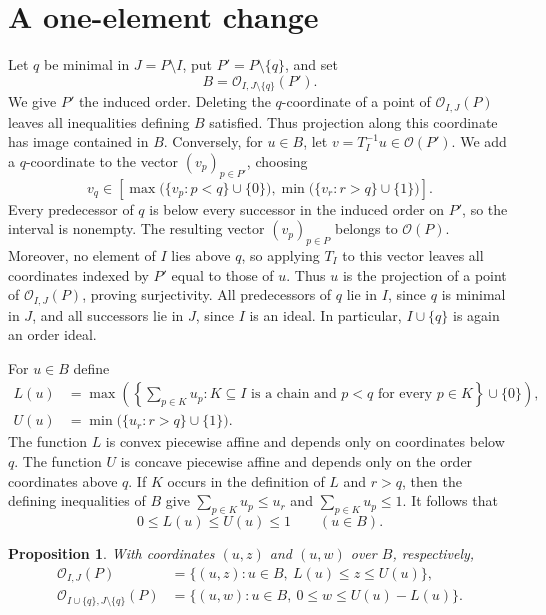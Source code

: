 \documentclass[a4paper,12pt]{amsart}
\newtheorem{proposition}[theorem]{Proposition}
\theoremstyle{definition}
\theoremstyle{remark}
\newcommand{\OO}{\mathcal O}
\begin{document}
\section{A one-element change}\label{sec3}

Let $q$ be minimal in $J=P\setminus I$, put $P'=P\setminus\{q\}$, and set
\[
 B=\OO_{I,J\setminus\{q\}}(P').
\]
We give $P'$ the induced order.
Deleting the $q$-coordinate of a point of $\OO_{I,J}(P)$ leaves all inequalities defining $B$ satisfied.
Thus projection along this coordinate has image contained in $B$.
Conversely, for $u\in B$, let $v=T_I^{-1}u\in\OO(P')$.
We add a $q$-coordinate to the vector $(v_p)_{p\in P'}$, choosing
\[
 v_q\in\left[   \max\bigl(\{v_p:p<q\}\cup\{0\}\bigr),   \min\bigl(\{v_r:r>q\}\cup\{1\}\bigr)\right].
\]
Every predecessor of $q$ is below every successor in the induced order on $P'$, so the interval is nonempty.
The resulting vector $(v_p)_{p\in P}$ belongs to $\OO(P)$.
Moreover, no element of $I$ lies above $q$, so applying $T_I$ to this vector leaves all coordinates indexed by $P'$ equal to those of $u$.
Thus $u$ is the projection of a point of $\OO_{I,J}(P)$, proving surjectivity.
All predecessors of $q$ lie in $I$, since $q$ is minimal in $J$, and all successors lie in $J$, since $I$ is an ideal.
In particular, $I\cup\{q\}$ is again an order ideal.

For $u\in B$ define
\begin{align*}
 L(u)&=\max\left( \left\{\sum_{p\in K}u_p: K\subseteq I\text{ is a chain and }p<q\text{ for every }p\in K\right\} \cup\{0\}\right),\\
 U(u)&=\min\bigl(\{u_r:r>q\}\cup\{1\}\bigr).
\end{align*}
The function $L$ is convex piecewise affine and depends only on coordinates below $q$.
The function $U$ is concave piecewise affine and depends only on the order coordinates above $q$.
If $K$ occurs in the definition of $L$ and $r>q$, then the defining inequalities of $B$ give $\sum_{p\in K}u_p\leq u_r$ and $\sum_{p\in K}u_p\leq1$.
It follows that
\[
 0\leq L(u)\leq U(u)\leq1 \qquad (u\in B).
\]

\begin{proposition}\label{prop:fibers}
With coordinates $(u,z)$ and $(u,w)$ over $B$, respectively,
\begin{align}
 \OO_{I,J}(P)&=\{(u,z):u\in B,\ L(u)\leq z\leq U(u)\},\label{eq:oldfiber}\\
 \OO_{I\cup\{q\},J\setminus\{q\}}(P)&= \{(u,w):u\in B,\ 0\leq w\leq U(u)-L(u)\}.\label{eq:newfiber}
\end{align}
\end{proposition}
\end{document}

